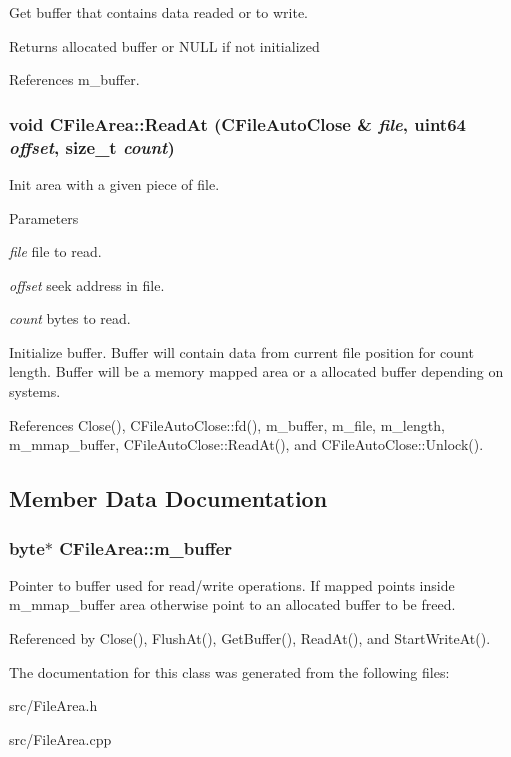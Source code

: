 Get buffer that contains data readed or to write. \begin{DoxyReturn}{Returns}
allocated buffer or NULL if not initialized 
\end{DoxyReturn}


References m\_\-buffer.
\subsubsection[{ReadAt}]{\setlength{\rightskip}{0pt plus 5cm}void CFileArea::ReadAt ({\bf CFileAutoClose} \& {\em file}, \/  uint64 {\em offset}, \/  size\_\-t {\em count})}\label{classCFileArea_ac9eae3430295d028bc0589d798bada94}


Init area with a given piece of file. 
\begin{DoxyParams}{Parameters}
\item[{\em file}]file to read. \item[{\em offset}]seek address in file. \item[{\em count}]bytes to read.\end{DoxyParams}
Initialize buffer. Buffer will contain data from current file position for count length. Buffer will be a memory mapped area or a allocated buffer depending on systems. 

References Close(), CFileAutoClose::fd(), m\_\-buffer, m\_\-file, m\_\-length, m\_\-mmap\_\-buffer, CFileAutoClose::ReadAt(), and CFileAutoClose::Unlock().

\subsection{Member Data Documentation}
\subsubsection[{m\_\-buffer}]{\setlength{\rightskip}{0pt plus 5cm}byte$\ast$ {\bf CFileArea::m\_\-buffer}\hspace{0.3cm}{\ttfamily  [private]}}\label{classCFileArea_a12d92f1596802b9f81efd67f640d1a0d}


Pointer to buffer used for read/write operations. If mapped points inside m\_\-mmap\_\-buffer area otherwise point to an allocated buffer to be freed. 

Referenced by Close(), FlushAt(), GetBuffer(), ReadAt(), and StartWriteAt().

The documentation for this class was generated from the following files:\begin{DoxyCompactItemize}
\item 
src/FileArea.h\item 
src/FileArea.cpp\end{DoxyCompactItemize}
